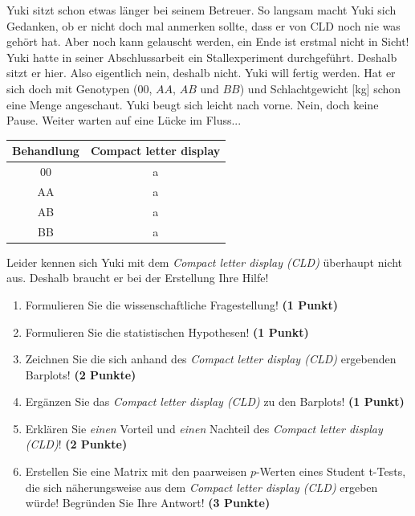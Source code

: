 \documentclass[a4paper, 9pt]{scrartcl}\usepackage[]{graphicx}\usepackage[]{xcolor}
\newenvironment{knitrout}{}{} %
\begin{document}
Yuki sitzt schon etwas länger bei seinem Betreuer. So langsam macht Yuki sich Gedanken, ob er nicht doch mal anmerken sollte, dass er von CLD noch nie was gehört hat. Aber noch kann gelauscht werden, ein Ende ist erstmal nicht in Sicht! Yuki hatte in seiner Abschlussarbeit ein Stallexperiment durchgeführt. Deshalb sitzt er hier. Also eigentlich nein, deshalb nicht. Yuki will fertig werden. Hat er sich doch mit Genotypen ($00$, $AA$, $AB$ und $BB$) und Schlachtgewicht [kg] schon eine Menge angeschaut. Yuki beugt sich leicht nach vorne. Nein, doch keine Pause. Weiter warten auf eine Lücke im Fluss...

\begin{knitrout}
\color{fgcolor}\begin{table}[!h]
\centering\begingroup\fontsize{10}{12}\selectfont

\begin{tabular}{cc}
\toprule
\textbf{Behandlung} & \textbf{Compact letter display}\\
\midrule
00 & a\\
AA & a\\
AB & a\\
BB & a\\
\bottomrule
\end{tabular}
\endgroup{}
\end{table}

\end{knitrout}

Leider kennen sich Yuki mit dem \textit{Compact letter display (CLD)} überhaupt nicht aus. Deshalb braucht er bei der Erstellung Ihre Hilfe!

\begin{enumerate}
  \item Formulieren Sie die wissenschaftliche Fragestellung! \textbf{(1 Punkt)}
  \item Formulieren Sie die statistischen Hypothesen! \textbf{(1 Punkt)}
\item Zeichnen Sie die sich anhand des \textit{Compact letter display (CLD)} ergebenden Barplots! \textbf{(2 Punkte)}
\item Ergänzen Sie das \textit{Compact letter display (CLD)} zu den Barplots! \textbf{(1 Punkt)}
\item Erklären Sie \textit{einen} Vorteil und \textit{einen} Nachteil des \textit{Compact letter display (CLD)}! \textbf{(2 Punkte)}
\item Erstellen Sie eine Matrix mit den paarweisen $p$-Werten eines Student t-Tests, die sich näherungsweise aus dem \textit{Compact letter display (CLD)} ergeben würde! Begründen Sie Ihre Antwort! \textbf{(3 Punkte)}
\end{enumerate}
\end{document}
